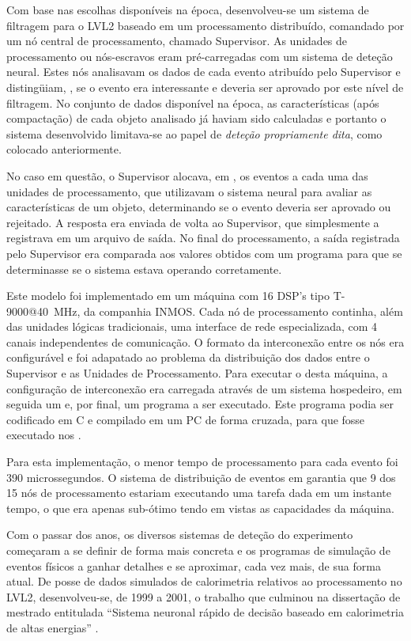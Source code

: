 Com base nas escolhas disponíveis na época, desenvolveu-se um sistema de
filtragem para o LVL2 baseado em um processamento distribuído, comandado por
um nó central de processamento, chamado Supervisor. As unidades de
processamento ou nós-escravos eram pré-carregadas com um sistema de deteção
neural. Estes nós analisavam os dados de cada evento atribuído pelo Supervisor
e distingüiam, , se o evento era interessante e deveria ser
aprovado por este nível de filtragem. No conjunto de dados disponível na
época, as características (após compactação) de cada objeto analisado já
haviam sido calculadas e portanto o sistema desenvolvido limitava-se ao papel
de \textit{deteção propriamente dita}, como colocado anteriormente.

No caso em questão, o Supervisor alocava, em , os eventos a
cada uma das unidades de processamento, que utilizavam o sistema neural para
avaliar as características de um objeto, determinando se o evento deveria ser
aprovado ou rejeitado. A resposta era enviada de volta ao Supervisor, que
simplesmente a registrava em um arquivo de saída. No final do processamento, a
saída registrada pelo Supervisor era comparada aos valores obtidos com um
programa  para que se determinasse se o sistema estava operando
corretamente.

Este modelo foi implementado em um máquina com 16 DSP's tipo T-9000@40~MHz, da
companhia INMOS. Cada nó de processamento continha, além das unidades lógicas
tradicionais, uma interface de rede especializada, com 4 canais independentes
de comunicação. O formato da interconexão entre os nós era configurável e foi
adapatado ao problema da distribuição dos dados entre o Supervisor e as
Unidades de Processamento. Para executar o  desta máquina, a
configuração de interconexão era carregada através de um sistema hospedeiro,
em seguida um  e, por final, um programa a ser
executado. Este programa podia ser codificado em C e compilado em um PC de
forma cruzada, para que fosse executado nos
.

Para esta implementação, o menor tempo de processamento para cada evento foi
390 microssegundos. O sistema de distribuição de eventos em
 garantia que 9 dos 15 nós de processamento estariam
executando uma tarefa dada em um instante tempo, o que era apenas sub-ótimo
tendo em vistas as capacidades da máquina.

Com o passar dos anos, os diversos sistemas de deteção do experimento
começaram a se definir de forma mais concreta e os programas de simulação de
eventos físicos a ganhar detalhes e se aproximar, cada vez mais, de sua forma
atual. De posse de dados simulados de calorimetria relativos ao processamento
no LVL2, desenvolveu-se, de 1999 a 2001, o trabalho que culminou na
dissertação de mestrado entitulada ``Sistema neuronal rápido de decisão
baseado em calorimetria de altas energias'' \cite{aa:msc-thesis}.

